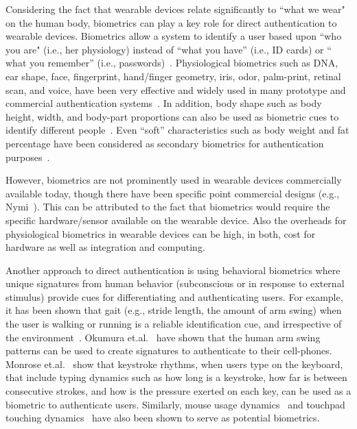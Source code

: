 Considering the fact that wearable devices relate significantly to ``what we wear" on the
human body, biometrics can play a key role for direct authentication to wearable
devices. Biometrics allow a system to identify a user based upon ``who you
are" (i.e., her physiology) instead of ``what you
have'' (i.e., ID cards) or `` what you remember'' (i.e.,
passwords)~\cite{jain2004introduction,o2003comparing,yampolskiy2007motor}.
Physiological biometrics such as DNA, ear shape, face, fingerprint,
hand/finger geometry,
iris, odor, palm-print, retinal scan, and voice, have been very effective and
widely used in many prototype and commercial authentication systems~\cite{wu1997measure,yan2007biometric,zhao1998discriminant,hong1998fingerprint,wildes1997iris,
yan2007biometric,baldisserra2005fake,hill2002retina,markowitz2000voice,reynolds2000speaker,bowyer2006survey,biddle2012graphical,sherman2014user,jain1997identity}.
In addition, body shape such as body height, width, and body-part proportions
can also be used as biometric cues to identify different
people~\cite{collins2002silhouette}. Even ``soft'' characteristics such as
body weight and fat percentage have been considered as secondary biometrics
for authentication purposes~\cite{ailisto2006soft}.

However, biometrics are
not prominently used in wearable devices commercially available today, though
there have been specific point commercial designs (e.g., Nymi~\cite{nymi}). This can be attributed to the
fact that biometrics would require the specific hardware/sensor available on
the wearable device. Also the overheads for physiological biometrics in
wearable devices can be high, in both, cost for hardware as well as
integration and computing.

Another approach to direct authentication is using behavioral biometrics
where unique signatures from human behavior (subconscious
or in response to external stimulus) provide cues for differentiating and
authenticating users. For example, it has been shown that gait (e.g.,
stride length, the
amount of arm swing) when the user is walking or
running is a reliable identification cue, and irrespective of the
environment~\cite{stevenage1999visual}. Okumura et.al.~\cite{okumura2006study}
have shown that the human arm swing patterns can be used to create signatures
to authenticate to their cell-phones. Monrose
et.al.~\cite{monrose2000keystroke} show that keystroke rhythms, when
users type on the keyboard, that include typing dynamics such as how
long is a keystroke, how far is between consecutive strokes, and how is the
pressure exerted on each key, can be used as a biometric to authenticate
users. Similarly, mouse usage dynamics~\cite{jorgensen2011mouse} and touchpad
touching dynamics~\cite{bo2013silentsense,de2012touch} have also been shown to
serve as potential biometrics.

